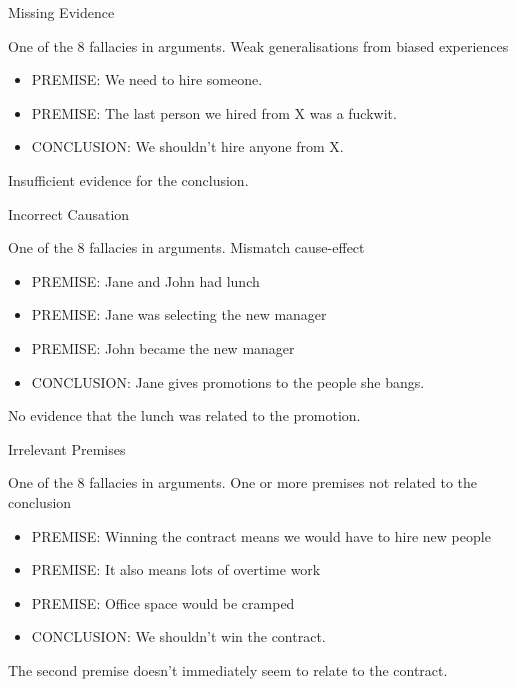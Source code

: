 \documentclass[]{../../DefinitionFormat}
\begin{document}
\begin{definition}{Missing Evidence}
	\begin{summary}
		One of the 8 fallacies in arguments. Weak generalisations from biased experiences
	\end{summary}
	\begin{itemize}[label={}]
		\item PREMISE: We need to hire someone.
		\item PREMISE: The last person we hired from X was a fuckwit.
		\item CONCLUSION: We shouldn't hire anyone from X.
	\end{itemize}
	\par Insufficient evidence for the conclusion.
\end{definition}

\begin{definition}{Incorrect Causation}
	\begin{summary}
		One of the 8 fallacies in arguments. Mismatch cause-effect
	\end{summary}
	\begin{itemize}[label={}]
		\item PREMISE: Jane and John had lunch
		\item PREMISE: Jane was selecting the new manager
		\item PREMISE: John became the new manager
		\item CONCLUSION: Jane gives promotions to the people she bangs.
	\end{itemize}
	\par No evidence that the lunch was related to the promotion.
\end{definition}

\begin{definition}{Irrelevant Premises}
	\begin{summary}
		One of the 8 fallacies in arguments. One or more premises not related to the conclusion
	\end{summary}
	\begin{itemize}[label={}]
		\item PREMISE: Winning the contract means we would have to hire new people
		\item PREMISE: It also means lots of overtime work
		\item PREMISE: Office space would be cramped
		\item CONCLUSION: We shouldn't win the contract.
	\end{itemize}		
	\par The second premise doesn't immediately seem to relate to the contract.
\end{definition}
\end{document}
